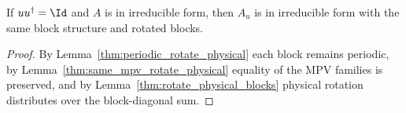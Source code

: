 \begin{lemma}%
    \label{thm:irreducible_form_rotate_physical}
    \leanok
    If $uu^\dagger=\Id$ and $A$ is in irreducible form, then
    $A_u$ is in irreducible form with the same block structure and
    rotated blocks.
\end{lemma}

\begin{proof}\leanok
    By Lemma~\ref{thm:periodic_rotate_physical} each block remains periodic,
    by Lemma~\ref{thm:same_mpv_rotate_physical} equality of the MPV families
    is preserved, and by Lemma~\ref{thm:rotate_physical_blocks} physical
    rotation distributes over the block-diagonal sum.
\end{proof}
